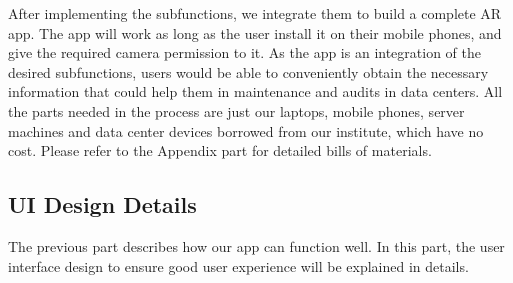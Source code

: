 \documentclass[11pt,a4paper]{article}
\begin{document}
\begin{onehalfspace}
After implementing the subfunctions, we integrate them to build a complete AR app. The app will work as long as the user install it on their mobile phones, and give the required camera permission to it. As the app is an integration of the desired subfunctions, users would be able to conveniently obtain the necessary information that could help them in maintenance and audits in data centers. All the parts needed in the process are just our laptops, mobile phones, server machines and data center devices borrowed from our institute, which have no cost. Please refer to the Appendix part for detailed bills of materials.

\subsection{UI Design Details}
The previous part describes how our app can function well. In this part, the user interface design to ensure good user experience will be explained in details.


\end{onehalfspace}
\end{document}
